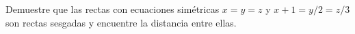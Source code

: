 \item Demuestre que las rectas con ecuaciones simétricas $x = y = z$ y $x + 1 = y/2 = z/3$ son rectas sesgadas y encuentre la distancia entre ellas.
